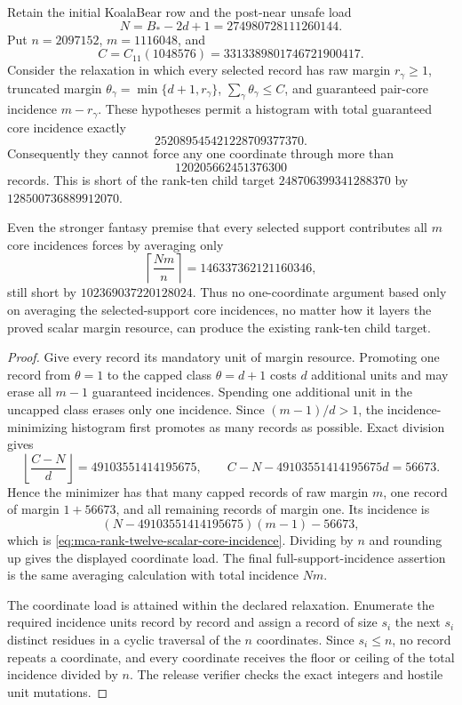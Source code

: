 \documentclass[11pt,a4paper]{amsart}
\numberwithin{equation}{section}
\theoremstyle{remark}
\begin{document}
\begin{proposition}
\label{prop:mca-rank-twelve-scalar-resource-barrier}
Retain the initial KoalaBear row and the post-near unsafe load
\[
 N=B_*-2d+1=274980728111260144.
\]
Put \(n=2097152\), \(m=1116048\), and
\[
 C=C_{11}(1048576)=3313389801746721900417.
\]
Consider the relaxation in which every selected record has raw margin
\(r_\gamma\ge1\), truncated margin
\(\theta_\gamma=\min\{d+1,r_\gamma\}\),
\(\sum_\gamma\theta_\gamma\le C\), and guaranteed pair-core incidence
\(m-r_\gamma\).  These hypotheses permit a histogram with total guaranteed
core incidence exactly
\[
 252089545421228709377370.
 \tag{R12S}\label{eq:mca-rank-twelve-scalar-core-incidence}
\]
Consequently they cannot force any one coordinate through more than
\[
 120205662451376300
\]
records.  This is short of the rank-ten child target
\(248706399341288370\) by \(128500736889912070\).

Even the stronger fantasy premise that every selected support contributes
all \(m\) core incidences forces by averaging only
\[
 \left\lceil\frac{Nm}{n}\right\rceil
 =146337362121160346,
\]
still short by \(102369037220128024\).  Thus no one-coordinate argument
based only on averaging the selected-support core incidences, no matter how
it layers the proved scalar margin resource, can produce the existing
rank-ten child target.
\end{proposition}

\begin{proof}
Give every record its mandatory unit of margin resource.  Promoting one
record from \(\theta=1\) to the capped class \(\theta=d+1\) costs \(d\)
additional units and may erase all \(m-1\) guaranteed incidences.  Spending
one additional unit in the uncapped class erases only one incidence.  Since
\((m-1)/d>1\), the incidence-minimizing histogram first promotes as many
records as possible.  Exact division gives
\[
 \left\lfloor\frac{C-N}{d}\right\rfloor
 =49103551414195675,
 \qquad
 C-N-49103551414195675d=56673.
\]
Hence the minimizer has that many capped records of raw margin \(m\), one
record of margin \(1+56673\), and all remaining records of margin one.  Its
incidence is
\[
 (N-49103551414195675)(m-1)-56673,
\]
which is \eqref{eq:mca-rank-twelve-scalar-core-incidence}.  Dividing by
\(n\) and rounding up gives the displayed coordinate load.  The final
full-support-incidence assertion is the same averaging calculation with
total incidence \(Nm\).

The coordinate load is attained within the declared relaxation.  Enumerate
the required incidence units record by record and assign a record of size
\(s_i\) the next \(s_i\) distinct residues in a cyclic traversal of the
\(n\) coordinates.  Since \(s_i\le n\), no record repeats a coordinate, and
every coordinate receives the floor or ceiling of the total incidence
divided by \(n\).  The release verifier checks the exact integers and hostile
unit mutations.
\end{proof}
\end{document}
